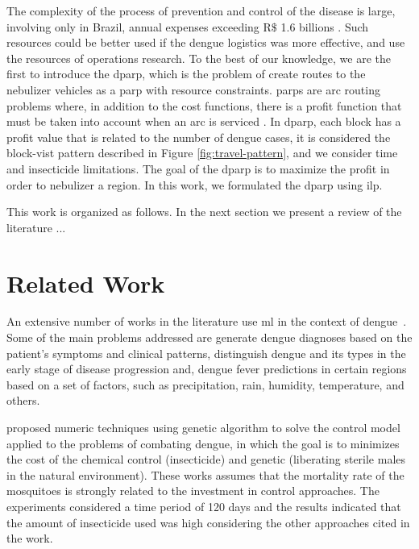 \documentclass[a4paper,11pt]{article}
\begin{document}
The complexity of the process of prevention and control of the disease is large,
involving  only  in  Brazil,  annual   expenses  exceeding  R$\$$  1.6  billions
\citep{negreiros-2020}.  Such  resources could  be  better  used if  the  dengue
logistics was more  effective, and use the resources of  operations research. To
the best of our knowledge, we are  the first to introduce the \gls{dparp}, which
is the problem of  create routes to the nebulizer vehicles  as a \gls{parp} with
resource constraints. \gls{parp}s are arc routing problems where, in addition to
the cost functions, there  is a profit function that must  be taken into account
when an  arc is serviced  \citep{araoz:2006}. In  \gls{dparp}, each block  has a
profit value that is related to the number of dengue cases, it is considered the
block-vist pattern described in Figure \ref{fig:travel-pattern}, and we consider
time and insecticide limitations. The goal of the \gls{dparp} is to maximize the
profit  in  order  to nebulizer  a  region.  In  this  work, we  formulated  the
\gls{dparp} using \gls{ilp}.

This work is  organized as follows. In  the next section we present  a review of
the literature ...


\section{Related Work} \label{sec:related-work}

An extensive number  of works in the  literature use \gls{ml} in  the context of
dengue~\citep{shakurat:2015,shakil:2015,hair:2019,sarma:2020,appice:2020}. Some
of  the main  problems  addressed are  generate dengue  diagnoses  based on  the
patient's symptoms  and clinical patterns,  distinguish dengue and its  types in
the early stage of disease progression  and, dengue fever predictions in certain
regions  based on  a  set of  factors, such  as  precipitation, rain,  humidity,
temperature, and others.

\cite{bannwart-sbpo:2013,bannwart:2013}   proposed   numeric  techniques   using
genetic  algorithm  to solve  the  control  model  applied  to the  problems  of
combating dengue,  in which the  goal is to minimizes  the cost of  the chemical
control  (insecticide) and  genetic  (liberating sterile  males  in the  natural
environment). These works  assumes that the mortality rate of  the mosquitoes is
strongly  related  to the  investment  in  control approaches.  The  experiments
considered a time period  of 120 days and the results  indicated that the amount
of insecticide used was high considering the other approaches cited in the work.
\end{document}
